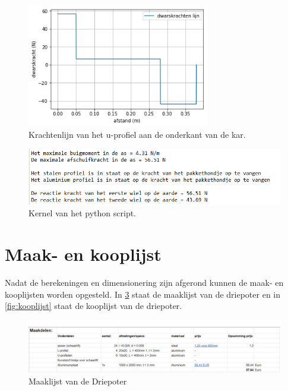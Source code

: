 \begin{figure}[H]
    \includegraphics[width = 80mm]{06_bijlage_F/onderkant_u_profiel/krachtenlijn_onderkant.png}
    \caption{Krachtenlijn van het u-profiel aan de onderkant van de kar.}
    \label{fig: krachtenlijn_onderkant}
\end{figure}
\vspace{\baselineskip}

\begin{figure}[H]
    \includegraphics[width = 120mm]{06_bijlage_F/onderkant_u_profiel/kernel_onderkant.PNG}
    \caption{Kernel van het python script.}
    \label{fig: kernel_onderkant}
\end{figure}
\vspace{\baselineskip}










\section{Maak- en kooplijst}
\label{maaklijst_kooplijst}

Nadat de berekeningen en dimensionering zijn afgerond kunnen de maak- en kooplijsten worden opgesteld. In \cref{fig:maaklijst} staat de maaklijst van de driepoter en in \cref{fig:kooplijst} staat de kooplijst van de driepoter.

\begin{figure}[H]
    \includegraphics[width = 120mm]{04_conceptdimensionering/Tabel_Maaklijst.JPG}
    \caption{Maaklijst van de Driepoter}
    \label{fig:maaklijst}
\end{figure}

